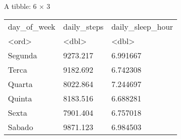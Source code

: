 \documentclass[11pt]{article}
\begin{document}
A tibble: 6 × 3
\begin{tabular}{lll}
    day\_of\_week & daily\_steps & daily\_sleep\_hour \\
    <ord>         & <dbl>        & <dbl>              \\
    \hline
    Segunda       & 9273.217     & 6.991667           \\
    Terca         & 9182.692     & 6.742308           \\
    Quarta        & 8022.864     & 7.244697           \\
    Quinta        & 8183.516     & 6.688281           \\
    Sexta         & 7901.404     & 6.757018           \\
    Sabado        & 9871.123     & 6.984503           \\
\end{tabular}
\end{document}
